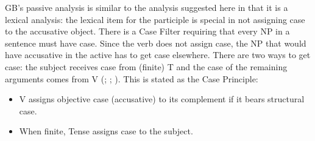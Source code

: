 \largerpage[2]
GB's passive analysis is similar to the analysis suggested here in that it is a lexical analysis:
the lexical item for the participle is special in not assigning case to the accusative object. There
is a Case Filter requiring that every NP in a sentence must have case. Since the verb does not
assign case, the NP that would have accusative in the active has to get case elsewhere. There are two
ways to get case: the subject receives case from (finite) T and
the case of the remaining arguments comes from V (\citealp[]{Chomsky81a}; \citealp[]{Haider84b}; \citealp[--73]{FF87a}). This is stated as the Case Principle:
\begin{principle-break}\label{Kasusprinzip-GB}
\begin{itemize}
\item V assigns objective case (accusative) to its complement if it bears structural case.
\item When finite, Tense assigns case to the subject.
\end{itemize}
\end{principle-break}

